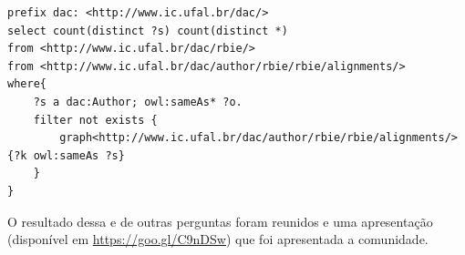 \begin{lstlisting}[captionpos=b, caption=Query SPARQL para recuperação de conceitos relacionados, label=lst:sparql3,
   basicstyle=\ttfamily,frame=single]
prefix dac: <http://www.ic.ufal.br/dac/>
select count(distinct ?s) count(distinct *)
from <http://www.ic.ufal.br/dac/rbie/>
from <http://www.ic.ufal.br/dac/author/rbie/rbie/alignments/>
where{
	?s a dac:Author; owl:sameAs* ?o. 
	filter not exists {
		graph<http://www.ic.ufal.br/dac/author/rbie/rbie/alignments/>{?k owl:sameAs ?s}
	}
}
\end{lstlisting}

O resultado dessa e de outras perguntas foram reunidos e uma apresentação (disponível em \url{https://goo.gl/C9nDSw}) que foi apresentada a comunidade.

